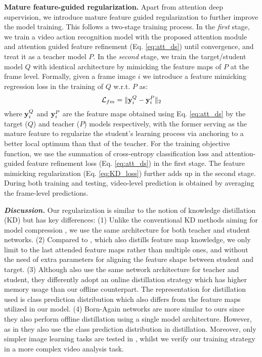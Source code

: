 \documentclass[runningheads]{llncs}
\newcommand{\keypoint}[1]{\vspace{0.1cm}\noindent\textbf{#1}\quad}
\begin{document}
\keypoint{Mature feature-guided regularization.}
Apart from attention deep supervision, we introduce
mature feature guided regularization to further improve the model training.
This follows a two-stage training process.
In the {\em first} stage, we train a video action recognition model with the proposed attention module and attention guided feature refinement (Eq. \eqref{eq:att_ds})
until convergence, and treat it as a teacher model $P$.
In the {\em second} stage, we train the target/student model $Q$ with identical architecture by mimicking the feature maps
of $P$ at the frame level.
Formally, given a frame image $i$ we introduce a feature mimicking regression loss
in the training of $Q$ w.r.t. $P $ as:
\begin{equation}
    \mathcal{L}_{fm} = \| {\bf y}_i^Q - {\bf y}_i^P \|_2
    \label{eq:KD_loss}
\end{equation}
where ${\bf y}_i^Q$ and ${\bf y}_i^P$ are the feature maps
obtained using Eq. \eqref{eq:att_ds} by the target ($Q$) and teacher ($P$) models respectively, with the former serving as the
mature feature to regularize the student's learning process via anchoring to  
a better local optimum than that of the teacher. For the training objective function, we use the summation of cross-entropy classification loss and attention-guided feature refinement loss (Eq. \eqref{eq:att_ds}) in the first stage. The feature mimicking regularization (Eq. \eqref{eq:KD_loss}) further adds up in the second stage. During both training and testing, video-level prediction is obtained by averaging the frame-level predictions.

\textbf{\em Discussion. }
Our regularization is similar to the notion of knowledge distillation (KD) \cite{furlanello2018born,hinton2015distilling,lan2018knowledge,romero2014fitnets,zhang2018deep} but has key differences:
(1) Unlike the conventional KD methods aiming for 
model compression \cite{hinton2015distilling,romero2014fitnets}, we use the same architecture for 
both teacher and student networks.
(2) Compared to \cite{romero2014fitnets}, which also distills feature map knowledge, we only limit to the last attended feature maps rather than multiple ones, and without the need of extra parameters for aligning the feature shape between student and target.
(3) Although \cite{lan2018knowledge,zhang2018deep}
also use the same network architecture for teacher and student, they differently adopt an online distillation strategy which has higher memory usage than our offline counterpart. The representation for distillation used is class prediction distribution which also differs from the feature maps utilized in our model.
(4) Born-Again networks \cite{furlanello2018born}
are more similar to ours since they also perform offline distillation using a single model architecture.
However, as in \cite{lan2018knowledge,zhang2018deep} they also use the class prediction distribution in distillation.
Moreover, only simpler image learning tasks are tested in \cite{furlanello2018born}, whilst we verify our training strategy in a more complex video analysis task.
\end{document}
